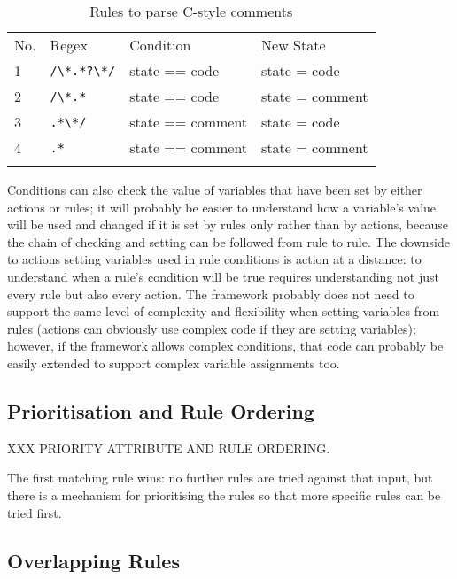 \begin{table}[ht]
    \caption{Rules to parse C-style comments}
    \empty{}\label{Rules to parse C-style comments}
    \begin{tabular}{llll}
        \tabletopline{}%
        No.   & Regex             & Condition         & New State         \\
        \tablemiddleline{}%
        1     & \verb!/\*.*?\*/!  & state == code     & state = code      \\
        2     & \verb!/\*.*!      & state == code     & state = comment   \\
        3     & \verb!.*\*/!      & state == comment  & state = code      \\
        4     & \verb!.*!         & state == comment  & state = comment   \\
        \tablebottomline{}%
    \end{tabular}
\end{table}

Conditions can also check the value of variables that have been set by
either actions or rules; it will probably be easier to understand how a
variable's value will be used and changed if it is set by rules only rather
than by actions, because the chain of checking and setting can be followed
from rule to rule.  The downside to actions setting variables used in rule
conditions is action at a distance: to understand when a rule's condition
will be true requires understanding not just every rule but also every
action.  The framework probably does not need to support the same level of
complexity and flexibility when setting variables from rules (actions can
obviously use complex code if they are setting variables); however, if the
framework allows complex conditions, that code can probably be easily
extended to support complex variable assignments too.

\subsection{Prioritisation and Rule Ordering}

\label{prioritisation and rule ordering}

XXX PRIORITY ATTRIBUTE AND RULE ORDERING\@.

The first matching rule wins: no further rules are tried against that
input, but there is a mechanism for prioritising the rules so that more
specific rules can be tried first.

\subsection{Overlapping Rules}

